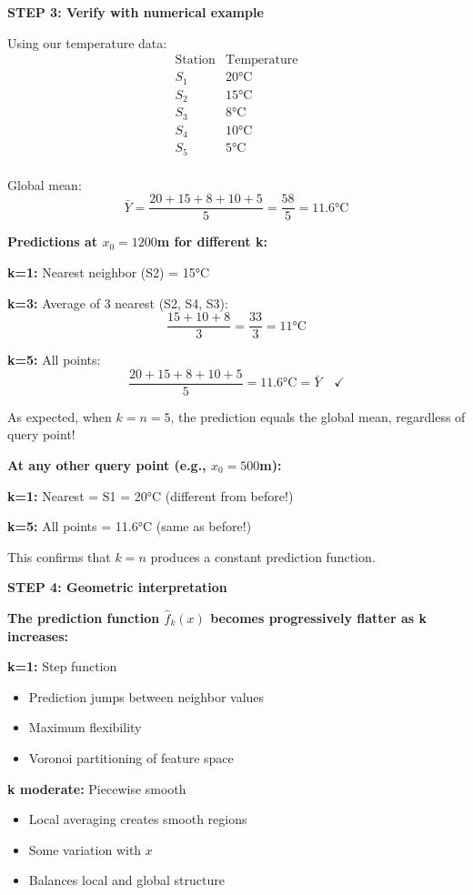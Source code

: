 \documentclass[12pt]{article}
\begin{document}
\begin{solution}
\textbf{STEP 3: Verify with numerical example}

Using our temperature data:
\[
\begin{array}{c|c}
\text{Station} & \text{Temperature} \\
\hline
S_1 & 20°\text{C} \\
S_2 & 15°\text{C} \\
S_3 & 8°\text{C} \\
S_4 & 10°\text{C} \\
S_5 & 5°\text{C} \\
\end{array}
\]

Global mean:
\[
\bar{Y} = \frac{20 + 15 + 8 + 10 + 5}{5} = \frac{58}{5} = 11.6°\text{C}
\]

\textbf{Predictions at $x_0 = 1200$m for different k:}

\textbf{k=1:} Nearest neighbor (S2) = 15°C

\textbf{k=3:} Average of 3 nearest (S2, S4, S3):
\[
\frac{15 + 10 + 8}{3} = \frac{33}{3} = 11°\text{C}
\]

\textbf{k=5:} All points:
\[
\frac{20 + 15 + 8 + 10 + 5}{5} = 11.6°\text{C} = \bar{Y} \quad \checkmark
\]

As expected, when \(k=n=5\), the prediction equals the global mean, regardless of query point!

\textbf{At any other query point (e.g., $x_0 = 500$m):}

\textbf{k=1:} Nearest = S1 = 20°C (different from before!)

\textbf{k=5:} All points = 11.6°C (same as before!)

This confirms that \(k=n\) produces a constant prediction function.

\textbf{STEP 4: Geometric interpretation}

\textbf{The prediction function \(\hat{f}_k(x)\) becomes progressively flatter as k increases:}

\textbf{k=1:} Step function
\begin{itemize}
    \item Prediction jumps between neighbor values
    \item Maximum flexibility
    \item Voronoi partitioning of feature space
\end{itemize}

\textbf{k moderate:} Piecewise smooth
\begin{itemize}
    \item Local averaging creates smooth regions
    \item Some variation with \(x\)
    \item Balances local and global structure
\end{itemize}


\end{solution}
\end{document}
